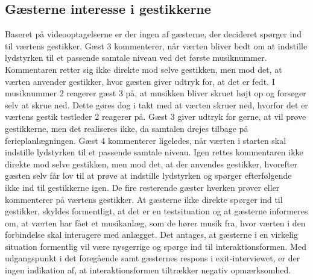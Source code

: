 \subsection{Gæsterne interesse i gestikkerne}
\label{TestresultaterSocialAcceptGaestSPGGestikker}
%
Baseret på videooptagelserne er der ingen af gæsterne, der decideret spørger ind til værtens gestikker. Gæst 3 kommenterer, når værten bliver bedt om at indstille lydstyrken til et passende samtale niveau ved det første musiknummer. Kommentaren retter sig ikke direkte mod selve gestikken, men mod det, at værten anvender gestikker, hvor gæsten giver udtryk for, at det er fedt. I musiknummer 2 reagerer gæst 3 på, at musikken bliver skruet højt op og forsøger selv at skrue ned. Dette gøres dog i takt med at værten skruer ned, hvorfor det er værtens gestik testleder 2 reagerer på. Gæst 3 giver udtryk for gerne, at vil prøve gestikkerne, men det realiseres ikke, da samtalen drejes tilbage på ferieplanlægningen. Gæst 4 kommenterer ligeledes, når værten i starten skal indstille lydstyrken til et passende samtale niveau. Igen rettes kommentaren ikke direkte mod selve gestikken, men mod det, at der anvendes gestikker, hvorefter gæsten selv får lov til at prøve at indstille lydstyrken og spørger efterfølgende ikke ind til gestikkerne igen. De fire resterende gæster hverken prøver eller kommenterer på værtens gestikker. At gæsterne ikke direkte spørger ind til gestikker, skyldes formentligt, at det er en testsituation og at gæsterne informeres om, at værten har fået et musikanlæg, som de hører musik fra, hvor værten i den forbindelse skal interagere med anlægget. Det antages, at gæsterne i en virkelig situation formentlig vil være nysgerrige og spørge ind til interaktionsformen. Med udgangspunkt i det foregående samt gæsternes respons i exit-interviewet, er der ingen indikation af, at interaktionsformen tiltrækker negativ opmærksomhed. 
%
